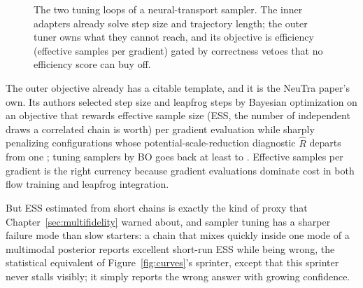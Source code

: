 \begin{figure}[t]
\centering
{}
\caption{The two tuning loops of a neural-transport sampler. The inner
adapters already solve step size and trajectory length; the outer tuner
owns what they cannot reach, and its objective is efficiency (effective
samples per gradient) gated by correctness vetoes that no efficiency
score can buy off.}
\label{fig:sampler-loops}
\end{figure}

The outer objective already has a citable template, and it is the NeuTra
paper's own. Its authors selected step size and leapfrog steps by
Bayesian optimization on an objective that rewards effective sample size
(ESS, the number of independent draws a correlated chain is worth)
per gradient evaluation while sharply penalizing configurations whose
potential-scale-reduction diagnostic $\widehat{R}$ departs from one
\citep{hoffman2019neutra}; tuning samplers by BO goes back at least to
\citet{mahendran2012adaptive}. Effective samples per gradient is the
right currency because gradient evaluations dominate cost in both flow
training and leapfrog integration.

But ESS estimated from short chains
is exactly the kind of proxy that Chapter~\ref{sec:multifidelity} warned
about, and sampler tuning has a sharper failure mode than slow starters:
a chain that mixes quickly inside one mode of a multimodal posterior
reports excellent short-run ESS while being wrong, the statistical
equivalent of Figure~\ref{fig:curves}'s sprinter, except that this
sprinter never stalls visibly; it simply reports the wrong answer with
growing confidence.


